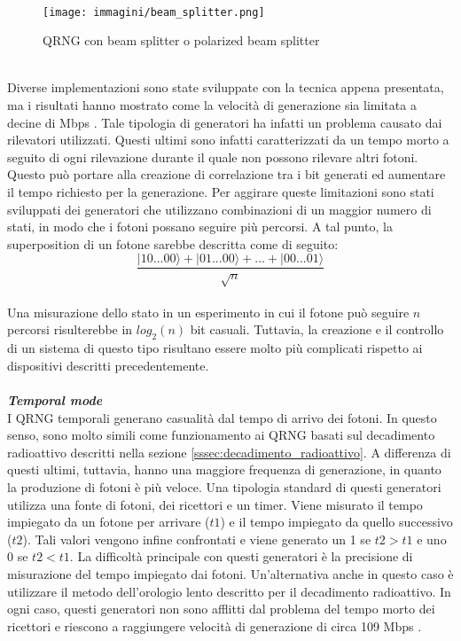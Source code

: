 \\
\begin{figure}[h]
    \centering
    \texttt{[image: immagini/beam\_splitter.png]}
    \caption{QRNG con beam splitter o polarized beam splitter}
    \label{fig:beam_splitter_QRNG}
\end{figure}
\\
Diverse implementazioni sono state sviluppate con la tecnica appena presentata, ma i risultati hanno mostrato come la velocità di generazione sia limitata a decine di Mbps \cite{jennewein_fast_2000}. Tale tipologia di generatori ha infatti un problema causato dai rilevatori utilizzati. Questi ultimi sono infatti caratterizzati da un tempo morto a seguito di ogni rilevazione durante il quale non possono rilevare altri fotoni. Questo può portare alla creazione di correlazione tra i bit generati ed aumentare il tempo richiesto per la generazione. Per aggirare queste limitazioni sono stati sviluppati dei generatori che utilizzano combinazioni di un maggior numero di stati, in modo che i fotoni possano seguire più percorsi. A tal punto, la superposition di un fotone sarebbe descritta come di seguito:
\\
\[\frac{|10...00\rangle+|01...00\rangle+...+|00...01\rangle}{\sqrt{n}}\]
\\
Una misurazione dello stato in un esperimento in cui il fotone può seguire $n$ percorsi risulterebbe in $log_2(n)$ bit casuali. Tuttavia, la creazione e il controllo di un sistema di questo tipo risultano essere molto più complicati rispetto ai dispositivi descritti precedentemente.
\\
\\
\textit{\textbf{Temporal mode}}\\
I QRNG temporali generano casualità dal tempo di arrivo dei fotoni. In questo senso, sono molto simili come funzionamento ai QRNG basati sul decadimento radioattivo descritti nella sezione \ref{sssec:decadimento_radioattivo}. A differenza di questi ultimi, tuttavia, hanno una maggiore frequenza di generazione, in quanto la produzione di fotoni è più veloce. Una tipologia standard di questi generatori utilizza una fonte di fotoni, dei ricettori e un timer. Viene misurato il tempo impiegato da un fotone per arrivare ($t1$) e il tempo impiegato da quello successivo ($t2$). Tali valori vengono infine confrontati e viene generato un 1 se $t2>t1$ e uno 0 se $t2<t1$. La difficoltà principale con questi generatori è la precisione di misurazione del tempo impiegato dai fotoni. Un'alternativa anche in questo caso è utilizzare il metodo dell'orologio lento descritto per il decadimento radioattivo. In ogni caso, questi generatori non sono afflitti dal problema del tempo morto dei ricettori e riescono a raggiungere velocità di generazione di circa 109 Mbps \cite{nie_practical_2014}.

